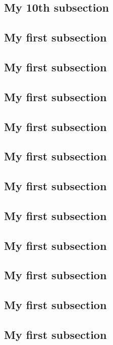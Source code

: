 \documentclass[fontsize=10pt,open=any,twocolumn]{scrbook}%
\begin{document}
            \subsection{My 10th subsection}
                \blindtext
            \subsection{My first subsection}
                \blindtext
            \subsection{My first subsection}
                \blindtext
            \subsection{My first subsection}
                \blindtext
            \subsection{My first subsection}
                \blindtext
            \subsection{My first subsection}
                \blindtext
            \subsection{My first subsection}
                \blindtext
            \subsection{My first subsection}
                \blindtext
            \subsection{My first subsection}
                \blindtext
            \subsection{My first subsection}
                \blindtext
            \subsection{My first subsection}
                \blindtext
            \subsection{My first subsection}
                \blindtext
\end{document}
